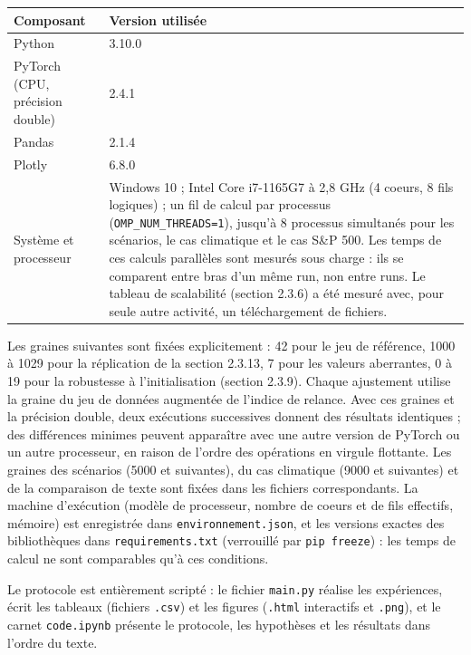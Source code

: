 \begin{table}[H]
\centering
\small
\setlength{\tabcolsep}{0.14cm}
\begin{tabular}{|p{7.42cm}|p{7.42cm}|}
\hline
\textbf{Composant} & \textbf{Version utilisée} \\
\hline
Python & 3.10.0 \\
\hline
PyTorch (CPU, précision double) & 2.4.1 \\
\hline
Pandas & 2.1.4 \\
\hline
Plotly & 6.8.0 \\
\hline
Système et processeur & Windows 10 ; Intel Core i7-1165G7 à 2,8 GHz (4 coeurs, 8 fils logiques) ; un fil de calcul par processus (\texttt{OMP\_NUM\_THREADS=1}), jusqu'à 8 processus simultanés pour les scénarios, le cas climatique et le cas S\&P 500. Les temps de ces calculs parallèles sont mesurés sous charge : ils se comparent entre bras d'un même run, non entre runs. Le tableau de scalabilité (section 2.3.6) a été mesuré avec, pour seule autre activité, un téléchargement de fichiers. \\
\hline
\end{tabular}
\end{table}
Les graines suivantes sont fixées explicitement : 42 pour le jeu de référence, 1000 à 1029 pour la réplication de la section 2.3.13, 7 pour les valeurs aberrantes, 0 à 19 pour la robustesse à l'initialisation (section 2.3.9). Chaque ajustement utilise la graine du jeu de données augmentée de l'indice de relance. Avec ces graines et la précision double, deux exécutions successives donnent des résultats identiques ; des différences minimes peuvent apparaître avec une autre version de PyTorch ou un autre processeur, en raison de l'ordre des opérations en virgule flottante. Les graines des scénarios (5000 et suivantes), du cas climatique (9000 et suivantes) et de la comparaison de texte sont fixées dans les fichiers correspondants. La machine d'exécution (modèle de processeur, nombre de coeurs et de fils effectifs, mémoire) est enregistrée dans \texttt{environnement.json}, et les versions exactes des bibliothèques dans \texttt{requirements.txt} (verrouillé par \texttt{pip freeze}) : les temps de calcul ne sont comparables qu'à ces conditions.

Le protocole est entièrement scripté : le fichier \texttt{main.py} réalise les expériences, écrit les tableaux (fichiers \texttt{.csv}) et les figures (\texttt{.html} interactifs et \texttt{.png}), et le carnet \texttt{code.ipynb} présente le protocole, les hypothèses et les résultats dans l'ordre du texte.

